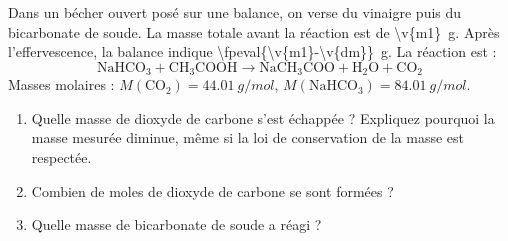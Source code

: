 Dans un bécher ouvert posé sur une balance, on verse du vinaigre puis du bicarbonate de soude. La masse totale avant la réaction est de \qty{\v{m1}}{g}. Après l'effervescence, la balance indique \qty{\fpeval{\v{m1}-\v{dm}}}{g}. La réaction est :
\[ \text{NaHCO}_3 + \text{CH}_3\text{COOH} \rightarrow \text{NaCH}_3\text{COO} + \text{H}_2\text{O} + \text{CO}_2 \]
Masses molaires : $M(\text{CO}_2) = \qty{44.01}{g/mol}$, $M(\text{NaHCO}_3) = \qty{84.01}{g/mol}$.

\begin{enumerate}[label=\alph*)]
    \item Quelle masse de dioxyde de carbone s'est échappée ? Expliquez pourquoi la masse mesurée diminue, même si la loi de conservation de la masse est respectée.
    \item Combien de moles de dioxyde de carbone se sont formées ?
    \item Quelle masse de bicarbonate de soude a réagi ?
\end{enumerate}
